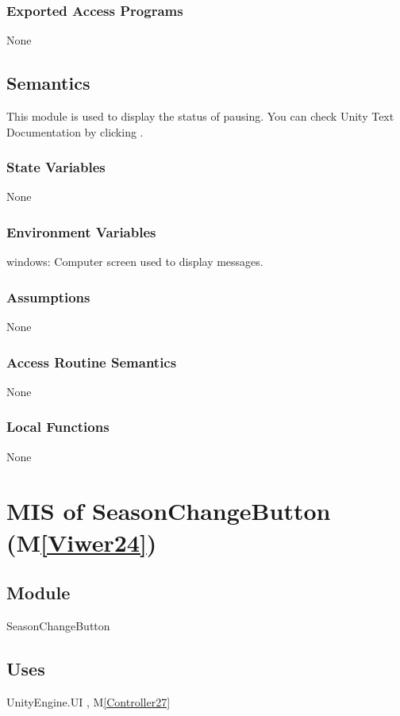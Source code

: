 \documentclass[12pt, titlepage]{article}
\newcommand{\mref}[1]{M\ref{#1}}
\begin{document}
\subsubsection{Exported Access Programs}
None

\subsection{Semantics}
This module is used to display the status of pausing. You can
check Unity Text Documentation by clicking \tref.

\subsubsection{State Variables}
None

\subsubsection{Environment Variables}

windows: Computer screen used to display messages.

\subsubsection{Assumptions}

None

\subsubsection{Access Routine Semantics}
None

\subsubsection{Local Functions}
None

\newpage

\section{MIS of SeasonChangeButton (\mref{Viwer24})} 

\subsection{Module}
SeasonChangeButton

\subsection{Uses}
UnityEngine.UI , \mref{Controller27}
\end{document}
